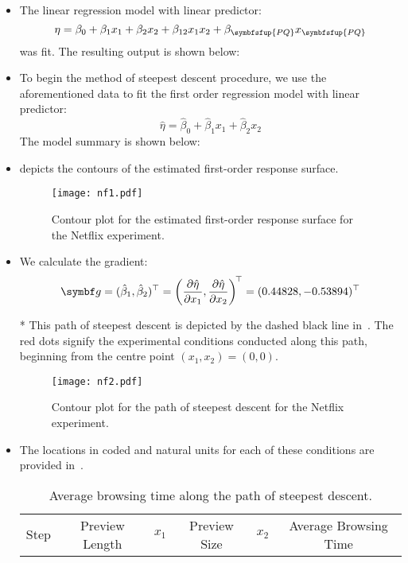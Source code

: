 \begin{itemize}
      \item The linear regression model with linear predictor:
            \[ \eta=\beta_0+\beta_1x_1+\beta_2x_2+\beta_{12}x_1x_2+\beta_{\symbfsfup{PQ}}x_{\symbfsfup{PQ}} \]
            was fit. The resulting output is shown below:
            
      \item To begin the method of steepest descent procedure, we use the aforementioned data to fit the first
            order regression model with linear predictor:
            \[ \hat{\eta}=\hat{\beta}_0+\hat{\beta}_1x_1+\hat{\beta}_2x_2 \]
            The model summary is shown below:
            
      \item {} depicts the contours of the estimated first-order response surface.
            \begin{figure}[!htbp]
                  \centering
                  \texttt{[image: nf1.pdf]}
                  \caption{Contour plot for the estimated first-order response surface for the Netflix experiment.}\label{fig:nf1}
            \end{figure}
      \item We calculate the gradient:
            \[ \Vector{g}=(\hat{\beta}_1,\hat{\beta}_2)^\top=\biggl(\pdv{\hat{\eta}}{x_1},\pdv{\hat{\eta}}{x_2}\biggr)^{\!\top}=(0.44828,-0.53894)^\top \]
      \item[*] This path of steepest descent is depicted by the dashed black line in~. The red dots signify
            the experimental conditions conducted along this path, beginning from the centre point $ (x_1,x_2)=(0,0) $.
            \begin{figure}[!htbp]
                  \centering
                  \texttt{[image: nf2.pdf]}
                  \caption{Contour plot for the path of steepest descent for the Netflix experiment.}\label{fig:nf2}
            \end{figure}
      \item The locations in coded and natural units for each of these conditions are provided in~.
            \begin{table}[!htbp]
                  \centering
                  \caption{Average browsing time along the path of steepest descent.}\label{tab:netflixtab2}
                  \begin{tabular}{cccccc}
                        \toprule Step & Preview Length & $x_{1}$  & Preview Size & $x_{2}$     & Average Browsing Time \\

\end{tabular}
\end{table}
\end{itemize}
